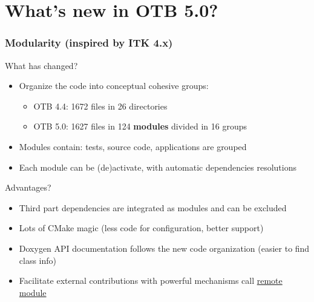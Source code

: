 \documentclass[8pt]{beamer}
\begin{document}
\section{What's new in OTB 5.0?}

\begin{frame}
\frametitle{Modularity (inspired by ITK 4.x)}
\begin{block}{What has changed?}
\begin{itemize}
\item  Organize the code into conceptual cohesive groups:
  \begin{itemize}
    \item OTB 4.4: 1672 files in 26 directories
    \item OTB 5.0: 1627 files in 124 \textbf{modules} divided in 16 groups
  \end{itemize}
\item Modules contain: tests, source code, applications are grouped
\item Each module can be (de)activate, with automatic dependencies resolutions
\end{itemize}
\end{block}

\begin{block}{Advantages?}
\begin{itemize}
\item Third part dependencies are integrated as modules and can be excluded
\item Lots of CMake magic (less code for configuration, better support)
\item Doxygen API documentation follows the new code organization (easier to
  find class info)
\item Facilitate external contributions with powerful mechanisms call
  \href{https://www.orfeo-toolbox.org/external-projects/}{\alert{remote module}}
\end{itemize}
\end{block}
\end{frame}
\end{document}
